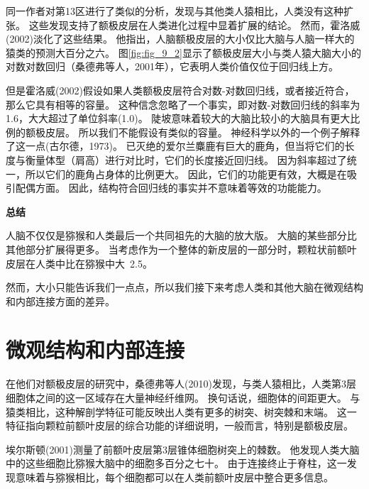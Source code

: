 \par

同一作者对第13区进行了类似的分析，发现与其他类人猿相比，人类没有这种扩张。
这些发现支持了额极皮层在人类进化过程中显着扩展的结论。
然而，霍洛威(2002)淡化了这些结果。
他指出，人脑额极皮层的大小仅比大脑与人脑一样大的猿类的预测大百分之六。
图\ref{fig:fig_9_2}显示了额极皮层大小与类人猿大脑大小的对数对数回归（桑德弗等人，2001年），它表明人类价值仅位于回归线上方。
\par


但是霍洛威(2002)假设如果人类额极皮层符合对数-对数回归线，或者接近符合，那么它具有相等的容量。
这种信念忽略了一个事实，即对数-对数回归线的斜率为1.6，大大超过了单位斜率(1.0)。
陡坡意味着较大的大脑比较小的大脑具有更大比例的额极皮层。
所以我们不能假设有类似的容量。
神经科学以外的一个例子解释了这一点(古尔德，1973)。
已灭绝的爱尔兰麋鹿有巨大的鹿角，但当将它们的长度与衡量体型（肩高）进行对比时，它们的长度接近回归线。
因为斜率超过了统一，所以它们的鹿角占身体的比例更大。
因此，它们的功能更有效，大概是在吸引配偶方面。
因此，结构符合回归线的事实并不意味着等效的功能能力。
\par



\textbf{总结}
\par

人脑不仅仅是猕猴和人类最后一个共同祖先的大脑的放大版。
大脑的某些部分比其他部分扩展得更多。
当考虑作为一个整体的新皮层的一部分时，颗粒状前额叶皮层在人类中比在猕猴中大~2.5。
\par


然而，大小只能告诉我们一点点，所以我们接下来考虑人类和其他大脑在微观结构和内部连接方面的差异。



\section{微观结构和内部连接}

在他们对额极皮层的研究中，桑德弗等人(2010)发现，与类人猿相比，人类第3层细胞体之间的这一区域存在大量神经纤维网。
换句话说，细胞体的间距更大。
与猿类相比，这种解剖学特征可能反映出人类有更多的树突、树突棘和末端。
这一特征指向颗粒前额叶皮层的综合功能的详细说明，一般而言，特别是额极皮层。
\par


埃尔斯顿(2001)测量了前额叶皮层第3层锥体细胞树突上的棘数。
他发现人类大脑中的这些细胞比猕猴大脑中的细胞多百分之七十。
由于连接终止于脊柱，这一发现意味着与猕猴相比，每个细胞都可以在人类前额叶皮层中整合更多信息。
\par


